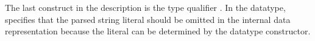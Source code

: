 The last construct in the \darkstar{} description is the type
qualifier .  In the  datatype,
 specifies that the parsed string literal should be omitted
in the internal data representation because the literal can be
determined by the datatype constructor.



